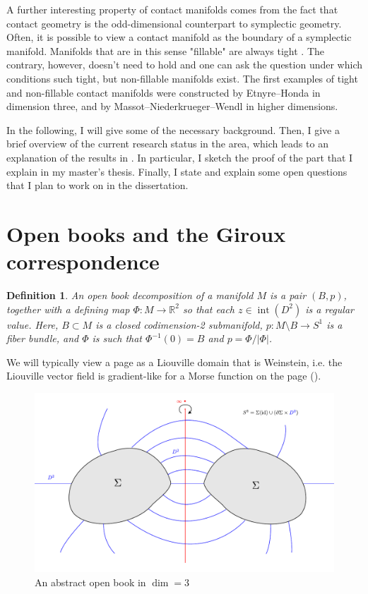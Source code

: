 \documentclass[a4paper]{amsart}
\newtheorem{definition}{Definition}
\begin{document}
A further interesting property of contact manifolds comes from the fact that contact geometry is the odd-dimensional counterpart to symplectic geometry. Often, it is possible to view a contact manifold as the boundary of a symplectic manifold. Manifolds that are in this sense "fillable" are always tight \cite{Gromov85,Eliashberg91}.
The contrary, however, doesn't need to hold and one can ask the question under which conditions such tight, but non-fillable manifolds exist. The first examples of tight and non-fillable contact manifolds were constructed by Etnyre--Honda \cite{EH02} in dimension three, and by Massot--Niederkrueger--Wendl \cite{MNW13} in higher dimensions.


In the following, I will give some of the necessary background.
Then, I give a brief overview of the current research status in the area, which leads
to an explanation of the results in \cite{BGMZ22}.
In particular, I sketch the proof of the part that I explain in my master's thesis. 
Finally, I state and explain some open questions that I plan to work on in the dissertation.

\section*{Open books and the Giroux correspondence}
\begin{definition}
    An open book decomposition of a manifold $M$ is a pair $(B, p)$, together with a defining map $\Phi:M \to \mathbb R^2$ so that each $z \in \operatorname{int}(D^2)$ is a regular value.
    Here, $B \subset M$ is a closed codimension-2 submanifold, $p: M\setminus B \to S^1$ is a fiber bundle, and $\Phi$ is such that $\Phi^{-1}(0) = B$ and $p =  \Phi / |\Phi|$.
\end{definition}
We will typically view a page as a Liouville domain that is Weinstein, i.e. the Liouville vector field is gradient-like for a Morse function on the page (\cite[Def 1.1.2]{BHH23}).


\begin{figure}
    \includegraphics*[width=\textwidth]{../document/images/abstract_open_book.pdf}
    \caption{An abstract open book in $\dim = 3$}
    \label{fig:abstract_open_book}
\end{figure}
\end{document}
